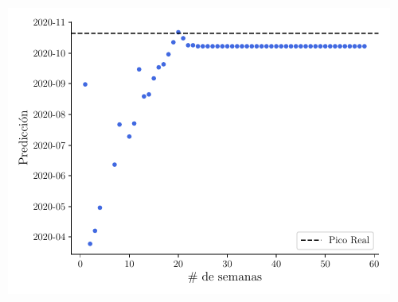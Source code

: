 \documentclass[twocolumn,aps,prl]{revtex4-1}
\begin{document}
\begin{figure}[ht!]
  \centering
      \centering
      \includegraphics[width = 0.9\textwidth]{figuras/ex02-prediccion-semanas.pdf}
      \label{fig:figuras/ex02-resumen}
  \caption{}
\end{figure}




% 
\end{document}
